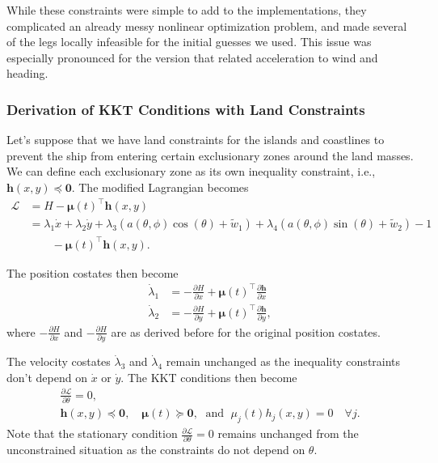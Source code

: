 \documentclass[11pt]{amsart}
\begin{document}
\par While these constraints were simple to add to the implementations, they complicated an already messy nonlinear optimization problem, and made several of the legs locally infeasible for the initial guesses we used. This issue was especially pronounced for the version that related acceleration to wind and heading.

\subsubsection{Derivation of KKT Conditions with Land Constraints}
Let's suppose that we have land constraints for the islands and coastlines to prevent the ship from entering certain exclusionary zones around the land masses. We can define each exclusionary zone as its own inequality constraint, i.e., $\mathbf{h}(x,y) \preceq \mathbf{0}$. The modified Lagrangian becomes 
\begin{align*}
    \mathscr{L} &= H - \boldsymbol{\mu}(t)^\top \boldsymbol{h}(x,y) \\
    &= \lambda_1 \dot{x} + \lambda_2 \dot{y} + \lambda_3(a(\theta, \phi)\cos(\theta) + \tilde{w}_1) + \lambda_4(a(\theta, \phi)\sin(\theta) + \tilde{w}_2) - 1 \\
    &\qquad - \boldsymbol{\mu}(t)^\top \boldsymbol{h}(x,y).
\end{align*}

\par The position costates then become 
\begin{align*}
    \dot{\lambda}_1 &= -\frac{\partial H}{\partial x} + \boldsymbol{\mu}(t)^\top\frac{\partial\mathbf{h}}{\partial x} \\
    \dot{\lambda}_2 &= -\frac{\partial H}{\partial y} + \boldsymbol{\mu}(t)^\top\frac{\partial\mathbf{h}}{\partial y},
\end{align*}
where $-\frac{\partial H}{\partial x}$ and $-\frac{\partial H}{\partial y}$ are as derived before for the original position costates.

\par The velocity costates $\dot{\lambda}_3$ and $\dot{\lambda}_4$ remain unchanged as the inequality constraints don't depend on $\dot{x}$ or $\dot{y}$.
The KKT conditions then become 
\begin{gather*}
    \frac{\partial \mathscr{L}}{\partial \theta} = 0, \\
    \mathbf{h}(x,y) \preceq \mathbf{0}, \quad \boldsymbol{\mu}(t) \succeq \mathbf{0}, \; \text{ and } \; \mu_j(t)h_j(x,y) = 0 \quad\forall j.
\end{gather*}
Note that the stationary condition $\frac{\partial \mathscr{L}}{\partial \theta} = 0$ remains unchanged from the unconstrained situation as the constraints do not depend on $\theta$. 
\end{document}

